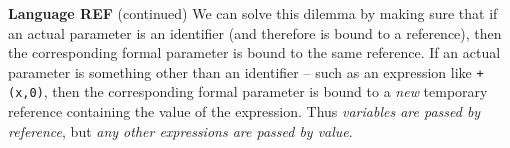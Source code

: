 \begin{minipage}[t]{\sw}
\slidenumber
\LARGE
{\bf Language REF} (continued)\exx
We can solve this dilemma by making sure that
if an actual parameter is an identifier
(and therefore is bound to a reference),
then the corresponding formal parameter is bound to the same reference.
If an actual parameter is something other than an identifier --
such as an expression like \verb'+(x,0)',
then the corresponding formal parameter is bound
to a {\em new} temporary reference
containing the value of the expression.
Thus {\em variables are passed by reference},
but {\em any other expressions are passed by value}.
\end{minipage}
